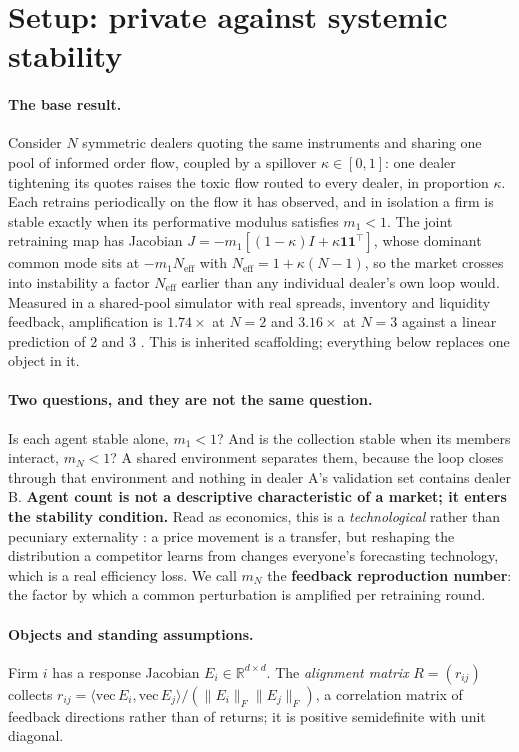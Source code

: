 \documentclass{article}
\theoremstyle{plain}
\theoremstyle{definition}
\newcommand{\Neff}{N_{\mathrm{eff}}}
\newcommand{\mN}{m_N}
\begin{document}
\section{Setup: private against systemic stability}
\label{sec:setup}

\paragraph{The base result.}
Consider $N$ symmetric dealers quoting the same instruments and sharing one pool of informed order flow, coupled by a spillover $\kappa \in [0,1]$: one dealer tightening its quotes raises the toxic flow routed to every dealer, in proportion $\kappa$. Each retrains periodically on the flow it has observed, and in isolation a firm is stable exactly when its performative modulus satisfies $m_1 < 1$. The joint retraining map has Jacobian $J = -m_1[(1-\kappa)I + \kappa \mathbf{1}\mathbf{1}^{\top}]$, whose dominant common mode sits at $-m_1 \Neff$ with $\Neff = 1+\kappa(N-1)$, so the market crosses into instability a factor $\Neff$ earlier than any individual dealer's own loop would. Measured in a shared-pool simulator with real spreads, inventory and liquidity feedback, amplification is $1.74\times$ at $N=2$ and $3.16\times$ at $N=3$ against a linear prediction of $2$ and $3$ \citep{reflex2026}. This is inherited scaffolding; everything below replaces one object in it.

\paragraph{Two questions, and they are not the same question.}
Is each agent stable alone, $m_1 < 1$? And is the collection stable when its members interact, $\mN < 1$? A shared environment separates them, because the loop closes through that environment and nothing in dealer A's validation set contains dealer B. \textbf{Agent count is not a descriptive characteristic of a market; it enters the stability condition.} Read as economics, this is a \emph{technological} rather than pecuniary externality \citep{buchanan1962}: a price movement is a transfer, but reshaping the distribution a competitor learns from changes everyone's forecasting technology, which is a real efficiency loss. We call $\mN$ the \textbf{feedback reproduction number}: the factor by which a common perturbation is amplified per retraining round.

\paragraph{Objects and standing assumptions.}
Firm $i$ has a response Jacobian $E_i \in \mathbb{R}^{d\times d}$. The \emph{alignment matrix} $R = (r_{ij})$ collects $r_{ij} = \langle \mathrm{vec}\,E_i, \mathrm{vec}\,E_j\rangle / (\|E_i\|_F \|E_j\|_F)$, a correlation matrix of feedback directions rather than of returns; it is positive semidefinite with unit diagonal.
\end{document}
